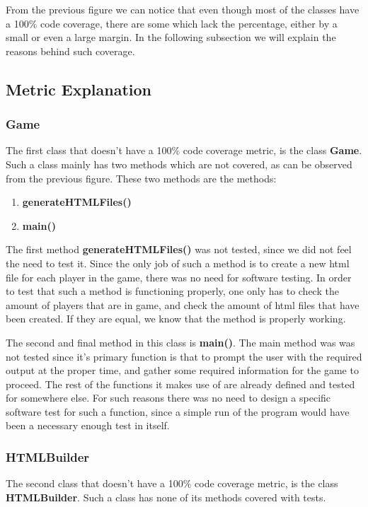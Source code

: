 \documentclass{article}
\begin{document}
\noindent
From the previous figure we can notice that even though most of the classes have a 100$\%$ code coverage, there are some which lack the percentage, either by a small or even a large margin. In the following subsection we will explain the reasons behind such coverage.

\subsection{Metric Explanation}

\subsubsection{Game}

The first class that doesn't have a 100$\%$ code coverage metric, is the class \textbf{Game}. Such a class mainly has two methods which are not covered, as can be observed from the previous figure. These two methods are the methods:

    \begin{enumerate}
        \item \textbf{generateHTMLFiles()}
        \item \textbf{main()}
    \end{enumerate}

\noindent
The first method \textbf{generateHTMLFiles()} was not tested, since we did not feel the need to test it. Since the only job of such a method is to create a new html file for each player in the game, there was no need for software testing. In order to test that such a method is functioning properly, one only has to check the amount of players that are in game, and check the amount of html files that have been created. If they are equal, we know that the method is properly working.

\noindent
The second and final method in this class is \textbf{main()}. The main method was was not tested since it's primary function is that to prompt the user with the required output at the proper time, and gather some required information for the game to proceed. The rest of the functions it makes use of are already defined and tested for somewhere else. For such reasons there was no need to design a specific software test for such a function, since a simple run of the program would have been a necessary enough test in itself.

\subsubsection{HTMLBuilder}
The second class that doesn't have a 100$\%$ code coverage metric, is the class \textbf{HTMLBuilder}. Such a class has none of its methods covered with tests.
\end{document}
